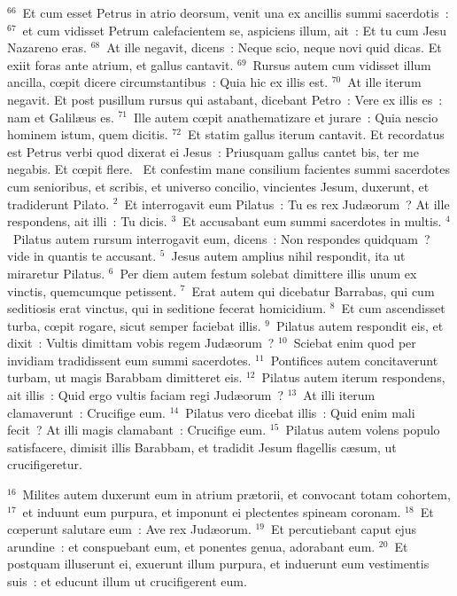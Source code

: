 ${}^{66}$~Et cum esset Petrus in atrio deorsum, venit una ex ancillis summi sacerdotis~:
${}^{67}$~et cum vidisset Petrum calefacientem se, aspiciens illum, ait~: Et tu cum Jesu Nazareno eras.
${}^{68}$~At ille negavit, dicens~: Neque scio, neque novi quid dicas. Et exiit foras ante atrium, et gallus cantavit.
${}^{69}$~Rursus autem cum vidisset illum ancilla, cœpit dicere circumstantibus~: Quia hic ex illis est.
${}^{70}$~At ille iterum negavit. Et post pusillum rursus qui astabant, dicebant Petro~: Vere ex illis es~: nam et Galil\ae us es.
${}^{71}$~Ille autem cœpit anathematizare et jurare~: Quia nescio hominem istum, quem dicitis.
${}^{72}$~Et statim gallus iterum cantavit. Et recordatus est Petrus verbi quod dixerat ei Jesus~: Priusquam gallus cantet bis, ter me negabis. Et cœpit flere.
~Et confestim mane consilium facientes summi sacerdotes cum senioribus, et scribis, et universo concilio, vincientes Jesum, duxerunt, et tradiderunt Pilato.
${}^{2}$~Et interrogavit eum Pilatus~: Tu es rex Jud\ae orum~? At ille respondens, ait illi~: Tu dicis.
${}^{3}$~Et accusabant eum summi sacerdotes in multis.
${}^{4}$~Pilatus autem rursum interrogavit eum, dicens~: Non respondes quidquam~? vide in quantis te accusant.
${}^{5}$~Jesus autem amplius nihil respondit, ita ut miraretur Pilatus.
${}^{6}$~Per diem autem festum solebat dimittere illis unum ex vinctis, quemcumque petissent.
${}^{7}$~Erat autem qui dicebatur Barrabas, qui cum seditiosis erat vinctus, qui in seditione fecerat homicidium.
${}^{8}$~Et cum ascendisset turba, cœpit rogare, sicut semper faciebat illis.
${}^{9}$~Pilatus autem respondit eis, et dixit~: Vultis dimittam vobis regem Jud\ae orum~?
${}^{10}$~Sciebat enim quod per invidiam tradidissent eum summi sacerdotes.
${}^{11}$~Pontifices autem concitaverunt turbam, ut magis Barabbam dimitteret eis.
${}^{12}$~Pilatus autem iterum respondens, ait illis~: Quid ergo vultis faciam regi Jud\ae orum~?
${}^{13}$~At illi iterum clamaverunt~: Crucifige eum.
${}^{14}$~Pilatus vero dicebat illis~: Quid enim mali fecit~? At illi magis clamabant~: Crucifige eum.
${}^{15}$~Pilatus autem volens populo satisfacere, dimisit illis Barabbam, et tradidit Jesum flagellis c\ae sum, ut crucifigeretur.


${}^{16}$~Milites autem duxerunt eum in atrium pr\ae torii, et convocant totam cohortem,
${}^{17}$~et induunt eum purpura, et imponunt ei plectentes spineam coronam.
${}^{18}$~Et cœperunt salutare eum~: Ave rex Jud\ae orum.
${}^{19}$~Et percutiebant caput ejus arundine~: et conspuebant eum, et ponentes genua, adorabant eum.
${}^{20}$~Et postquam illuserunt ei, exuerunt illum purpura, et induerunt eum vestimentis suis~: et educunt illum ut crucifigerent eum.


